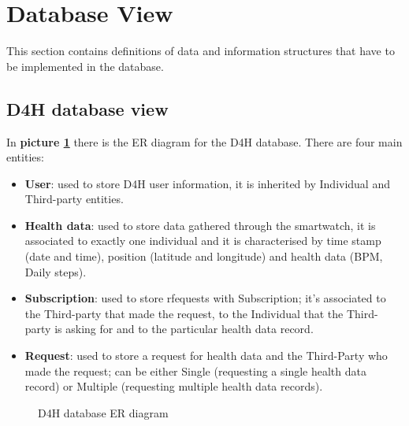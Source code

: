 \section{Database View}

This section contains definitions of data and information structures that have to be implemented in the database.

\subsection{D4H database view}

In \textbf{picture \ref{fig:D4H-er}} there is the ER diagram for the D4H database.
There are four main entities:
\begin{itemize}
    \item \textbf{User}: used to store D4H user information, it is inherited by Individual and Third-party entities.
    \item \textbf{Health data}: used to store data gathered through the smartwatch, it is associated to exactly one individual and it is characterised by time stamp (date and time), position (latitude and longitude) and health data (BPM, Daily steps). 
    \item \textbf{Subscription}: used to store rfequests with Subscription; it's associated to the Third-party that made the request, to the Individual that the Third-party is asking for and to the particular health data record.
    \item \textbf{Request}: used to store a request for health data and the Third-Party who made the request; can be either Single (requesting a single health data record) or Multiple (requesting multiple health data records).
\end{itemize}

\begin{figure}[H]
    \centering
    \caption{D4H database ER diagram}
    \label{fig:D4H-er}
\end{figure}

